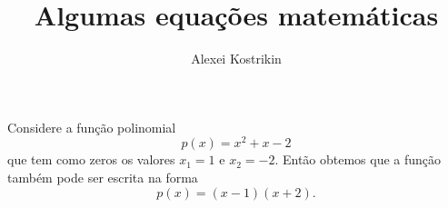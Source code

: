 \documentclass[12pt, a4paper]{article}
\title{Algumas equações matemáticas}
\author{Alexei Kostrikin}
\date{}
\begin{document}
  \maketitle

  Considere a função polinomial
  \[
    p(x) = x^2 + x - 2
  \]
  que tem como zeros os valores $x_1 = 1$ e $x_2 = -2$. Então obtemos que a função também pode ser escrita na forma
  \begin{equation}
    p(x) = (x-1)(x+2).
  \end{equation}
\end{document}
